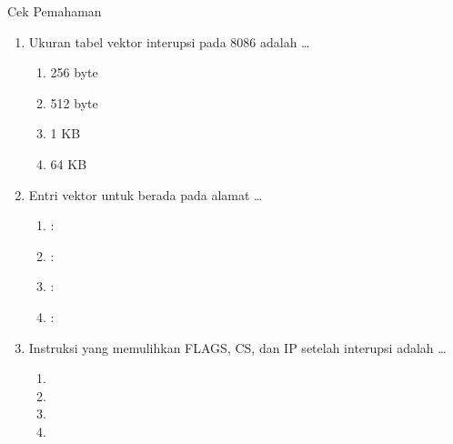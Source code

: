 \documentclass[aspectratio=169,11pt]{beamer}
\begin{document}
\begin{frame}{Cek Pemahaman}
\footnotesize
\begin{enumerate}
    \item Ukuran tabel vektor interupsi pada 8086 adalah \dots
          \begin{enumerate}
              \item 256 byte \quad \item 512 byte \quad
              \item 1 KB \quad \item 64 KB
          \end{enumerate}

    \vspace{0.2em}
    \item Entri vektor untuk  berada pada alamat
          \dots
          \begin{enumerate}
              \item {}:
              \item {}:
              \item {}:
              \item {}:
          \end{enumerate}

    \vspace{0.2em}
    \item Instruksi yang memulihkan FLAGS, CS, dan IP setelah
          interupsi adalah \dots
          \begin{enumerate}
              \item {} \quad \item {} \quad
              \item {} \quad \item {}
          \end{enumerate}
\end{enumerate}
\end{frame}
\end{document}
